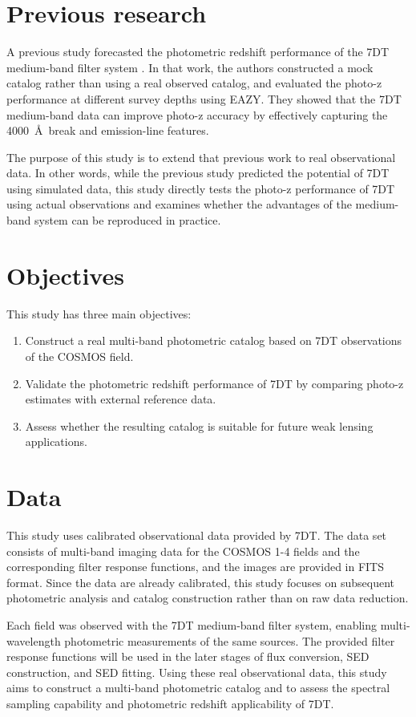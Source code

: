 \documentclass[11pt]{article}
\let\cite\citep
\begin{document}
\section{Previous research}
A previous study forecasted the photometric redshift performance of the 7DT medium-band filter system \cite{Ko2025}. In that work, the authors constructed a mock catalog rather than using a real observed catalog, and evaluated the photo-z performance at different survey depths using EAZY. They showed that the 7DT medium-band data can improve photo-z accuracy by effectively capturing the 4000~\AA\ break and emission-line features.

The purpose of this study is to extend that previous work to real observational data. In other words, while the previous study predicted the potential of 7DT using simulated data, this study directly tests the photo-z performance of 7DT using actual observations and examines whether the advantages of the medium-band system can be reproduced in practice.


\section{Objectives}

This study has three main objectives:
\begin{enumerate}
    \item Construct a real multi-band photometric catalog based on 7DT observations of the COSMOS field.
    \item Validate the photometric redshift performance of 7DT by comparing photo-z estimates with external reference data.
    \item Assess whether the resulting catalog is suitable for future weak lensing applications.
\end{enumerate}

\section{Data}

This study uses calibrated observational data provided by 7DT. The data set consists of multi-band imaging data for the COSMOS 1-4 fields and the corresponding filter response functions, and the images are provided in FITS format. Since the data are already calibrated, this study focuses on subsequent photometric analysis and catalog construction rather than on raw data reduction.

Each field was observed with the 7DT medium-band filter system, enabling multi-wavelength photometric measurements of the same sources. The provided filter response functions will be used in the later stages of flux conversion, SED construction, and SED fitting. Using these real observational data, this study aims to construct a multi-band photometric catalog and to assess the spectral sampling capability and photometric redshift applicability of 7DT.
\end{document}
